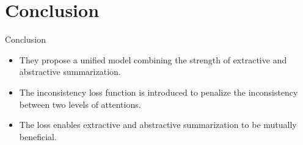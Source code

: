 \documentclass[17pt, unicode,dvipdfmx]{beamer}
\begin{document}
\section{Conclusion}
\begin{frame}{Conclusion}
  \begin{itemize}
    \item  They propose a unified model combining the
strength of extractive and abstractive summarization. \\
 \item The inconsistency loss function is introduced to penalize the inconsistency between two levels of attentions.\\
 \item The loss enables extractive and abstractive summarization to be mutually beneficial. 
  \end{itemize}
  \end{frame}
\end{document}
